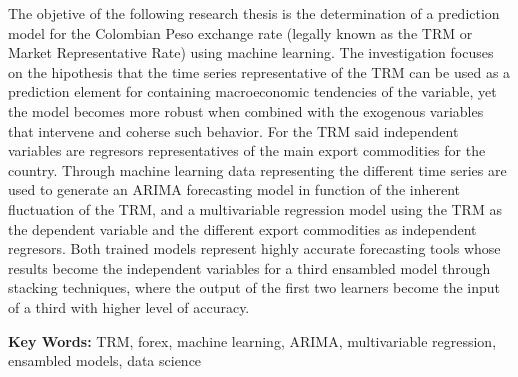 \normalsize
The objetive of the following research thesis is the determination of a prediction model for the Colombian Peso exchange rate (legally known as the TRM or Market Representative Rate) using machine learning. The investigation focuses on the hipothesis that the time series representative of the TRM can be used as a prediction element for containing macroeconomic tendencies of the variable, yet the model becomes more robust when combined with the exogenous variables that intervene and coherse such behavior. For the TRM said independent variables are regresors representatives of the main export commodities for the country.  Through machine learning data representing the different time series are used to generate an ARIMA forecasting model in function of the inherent fluctuation of the TRM, and a multivariable regression model using the TRM as the dependent variable and the different export commodities as independent regresors. Both trained models represent highly accurate forecasting tools whose results become the independent variables for a third ensambled model through stacking techniques, where the output of the first two learners become the input of a third with higher level of accuracy.

\textbf{Key Words:} TRM, forex, machine learning, ARIMA, multivariable regression, ensambled models, data science
